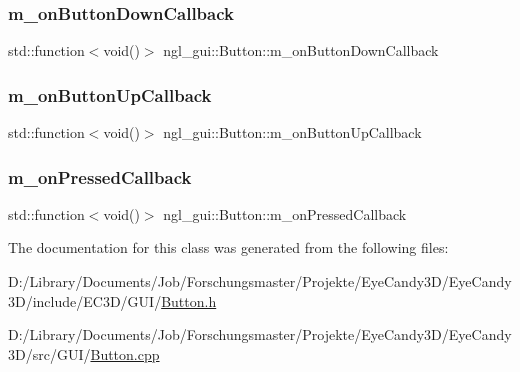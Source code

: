 \subsubsection{\texorpdfstring{m\+\_\+on\+Button\+Down\+Callback}{m\_onButtonDownCallback}}
{\footnotesize\ttfamily std\+::function$<$void()$>$ ngl\+\_\+gui\+::\+Button\+::m\+\_\+on\+Button\+Down\+Callback\hspace{0.3cm}{\ttfamily [protected]}}

\mbox{\label{classngl__gui_1_1_button_a12f95fd476017194b064040fe071f4f7}} 
\subsubsection{\texorpdfstring{m\+\_\+on\+Button\+Up\+Callback}{m\_onButtonUpCallback}}
{\footnotesize\ttfamily std\+::function$<$void()$>$ ngl\+\_\+gui\+::\+Button\+::m\+\_\+on\+Button\+Up\+Callback\hspace{0.3cm}{\ttfamily [protected]}}

\mbox{\label{classngl__gui_1_1_button_af090b33093b5b400f3f28e22f82d7fd2}} 
\subsubsection{\texorpdfstring{m\+\_\+on\+Pressed\+Callback}{m\_onPressedCallback}}
{\footnotesize\ttfamily std\+::function$<$void()$>$ ngl\+\_\+gui\+::\+Button\+::m\+\_\+on\+Pressed\+Callback\hspace{0.3cm}{\ttfamily [protected]}}



The documentation for this class was generated from the following files\+:\begin{DoxyCompactItemize}
\item 
D\+:/\+Library/\+Documents/\+Job/\+Forschungsmaster/\+Projekte/\+Eye\+Candy3\+D/\+Eye\+Candy3\+D/include/\+E\+C3\+D/\+G\+U\+I/\mbox{\hyperlink{_button_8h}{Button.\+h}}\item 
D\+:/\+Library/\+Documents/\+Job/\+Forschungsmaster/\+Projekte/\+Eye\+Candy3\+D/\+Eye\+Candy3\+D/src/\+G\+U\+I/\mbox{\hyperlink{_button_8cpp}{Button.\+cpp}}\end{DoxyCompactItemize}
